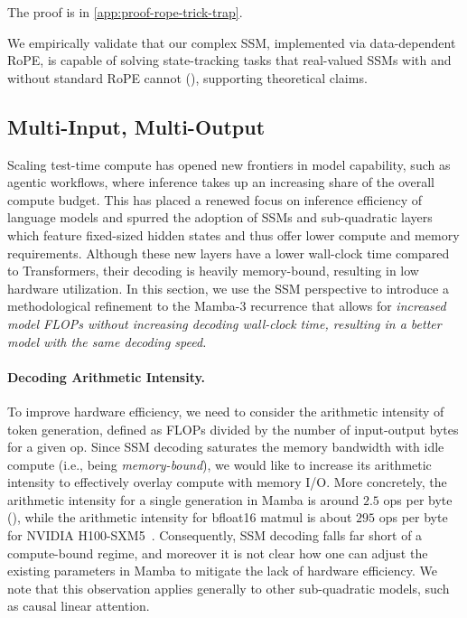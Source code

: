 \documentclass{article}
\newcommand{\citep}{\parencite}
\theoremstyle{plain}
\theoremstyle{definition}
\theoremstyle{remark}
\begin{document}
The proof is in \cref{app:proof-rope-trick-trap}.

We empirically validate that our complex SSM, implemented via data-dependent RoPE, is capable of solving state-tracking tasks that real-valued SSMs with and without standard RoPE cannot (), supporting theoretical claims.

\subsection{Multi-Input, Multi-Output}
\label{sec:method:mimo}

Scaling test-time compute has opened new frontiers in model capability, such as agentic workflows, where inference takes up an increasing share of the overall compute budget.
This has placed a renewed focus on inference efficiency of language models and spurred the adoption of SSMs and sub-quadratic layers which feature fixed-sized hidden states and thus offer lower compute and memory requirements.
Although these new layers have a lower wall-clock time compared to Transformers, their decoding is heavily memory-bound, resulting in low hardware utilization.
In this section, we use the SSM perspective to introduce a methodological refinement to the Mamba-3 recurrence that allows for \emph{increased model FLOPs without increasing decoding wall-clock time, resulting in a better model with the same decoding speed.}

\paragraph{Decoding Arithmetic Intensity.}
To improve hardware efficiency, we need to consider the arithmetic intensity of token generation, 
defined as FLOPs divided by the number of input-output bytes for a given op. 
Since SSM decoding saturates the memory bandwidth with idle compute (i.e., being \textit{memory-bound}), we would like to increase its arithmetic intensity to effectively overlay compute with memory I/O.
More concretely, the arithmetic intensity for a single generation in Mamba is around $2.5$ ops per byte (), while the arithmetic intensity for bfloat16 matmul is about $295$ ops per byte for NVIDIA H100-SXM5~\citep{nvidia_h100_2022}. Consequently, SSM decoding falls far short of a compute-bound regime, and moreover it is not clear how one can adjust the existing parameters in Mamba to mitigate the lack of hardware efficiency. 
We note that this observation applies generally to other sub-quadratic models, such as causal linear attention.
\end{document}
